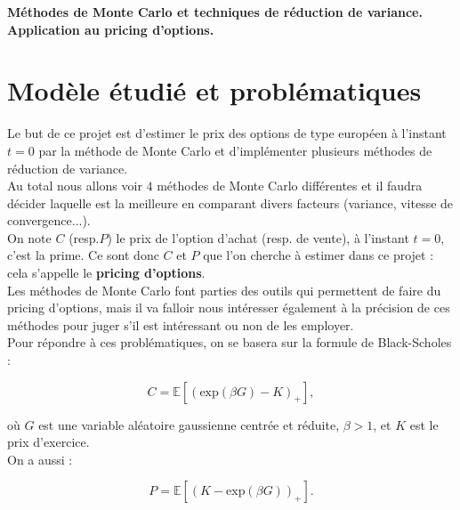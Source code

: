 \documentclass{article}
\theoremstyle{exostyle}
\begin{document}
\begin{center} 
	{\large\bf{Méthodes de Monte Carlo et techniques de réduction de variance. Application au pricing d'options.}}
\end{center}

\bigskip

\bigbreak
\bigbreak
\bigbreak
\bigbreak
\bigbreak
\bigbreak

\renewcommand{\contentsname}{Sommaire}
\tableofcontents




\newpage



\section{Modèle étudié et problématiques}

\noindent Le but de ce projet est d'estimer le prix des options de type européen à l'instant $t=0$ par la méthode de Monte Carlo et d'implémenter plusieurs méthodes de réduction de variance.\\ Au total nous allons voir $4$ méthodes de Monte Carlo différentes et il faudra décider laquelle est la meilleure en comparant divers facteurs (variance, vitesse de convergence...).\\

\noindent On note $C$ (resp.$P$) le prix de l'option d'achat (resp. de vente), à l'instant $t=0$, c'est la prime. Ce sont donc $C$ et $P$ que l'on cherche à estimer dans ce projet : cela s'appelle le \textbf{pricing d'options}.\\

\noindent Les méthodes de Monte Carlo font parties des outils qui permettent de faire du pricing d'options, mais il va falloir nous intéresser également à la précision de ces méthodes pour juger s'il est intéressant ou non de les employer.\\

\noindent Pour répondre à ces problématiques, on se basera sur la formule de Black-Scholes : 

\[C = \mathbb{E}[(\text{exp}(\beta G) - K)_{+}],\]

\noindent où $G$ est une variable aléatoire gaussienne centrée et réduite, $\beta > 1$, et $K$ est le prix d'exercice.\\

\noindent On a aussi : 

\[P = \mathbb{E}[(K - \text{exp}(\beta G) )_{+}].\]
\end{document}
